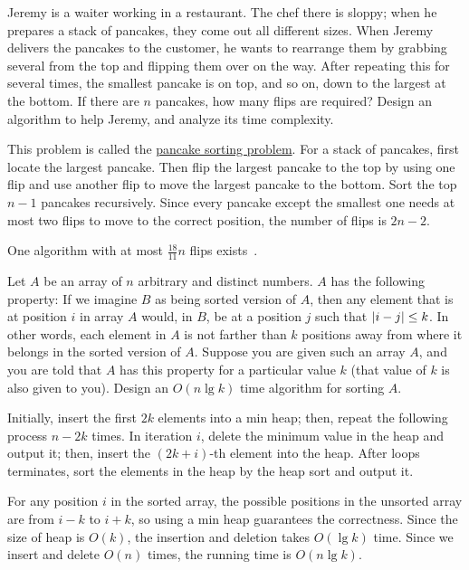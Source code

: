 \begin{Exercise}[origin={NCKU CSIE 102},difficulty=1]
Jeremy is a waiter working in a restaurant. The chef there is sloppy; when he prepares a stack of pancakes, they come out all different sizes. When Jeremy delivers the pancakes to the customer, he wants to rearrange them by grabbing several from the top and flipping them over on the way. After repeating this for several times, the smallest pancake is on top, and so on, down to the largest at the bottom. If there are $n$ pancakes, how many flips are required? Design an algorithm to help Jeremy, and analyze its time complexity.
\end{Exercise}
\begin{Answer}
This problem is called the \href{https://en.wikipedia.org/wiki/Pancake_sorting}{pancake sorting problem}. For a stack of pancakes, first locate the largest pancake. Then flip the largest pancake to the top by using one flip and use another flip to move the largest pancake to the bottom. Sort the top $n-1$ pancakes recursively. Since every pancake except the smallest one needs at most two flips to move to the correct position, the number of flips is $2n - 2$.

\begin{remark}
One algorithm with at most $\frac{18}{11}n$ flips exists~\cite{Chitturi2009}.
\end{remark}
\end{Answer}

\begin{Exercise}[origin={NTUT CSIE 95}]
Let $A$ be an array of $n$ arbitrary and distinct numbers. $A$ has the following property: If we imagine $B$ as being sorted version of $A$, then any element that is at position $i$ in array $A$ would, in $B$, be at a position $j$ such that $\lvert i - j\rvert \leq k$. In other words, each element in $A$ is not farther than $k$ positions away from where it belongs in the sorted version of $A$. Suppose you are given such an array $A$, and you are told that $A$ has this property for a particular value $k$ (that value of $k$ is also given to you). Design an $O(n \lg k)$ time algorithm for sorting $A$.
\end{Exercise}
\begin{Answer}
Initially, insert the first $2k$ elements into a min heap; then, repeat the following process $n - 2k$ times. In iteration $i$, delete the minimum value in the heap and output it; then, insert the $(2k + i)$-th element into the heap. After loops terminates, sort the elements in the heap by the heap sort and output it.

For any position $i$ in the sorted array, the possible positions in the unsorted array are from $i - k$ to $i + k$, so using a min heap guarantees the correctness. 
Since the size of heap is $O(k)$, the insertion and deletion takes $O(\lg k)$ time. 
Since we insert and delete $O(n)$ times, the running time is $O(n \lg k)$.
\end{Answer}

